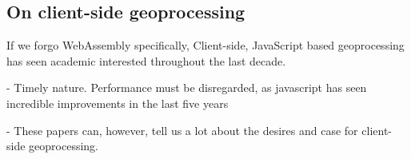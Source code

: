 \subsection{On client-side geoprocessing}

If we forgo WebAssembly specifically, Client-side, JavaScript based geoprocessing has seen academic interested throughout the last decade. 

\cite{hamilton_client-side_2014}


\cite{panidi_hybrid_2015}


\cite{kulawiak_analysis_2019}


- Timely nature. Performance must be disregarded, as javascript has seen incredible improvements in the last five years \cite{haas_bringing_2017, sandhu_sparse_2018}

- These papers can, however, tell us a lot about the desires and case for client-side geoprocessing.











